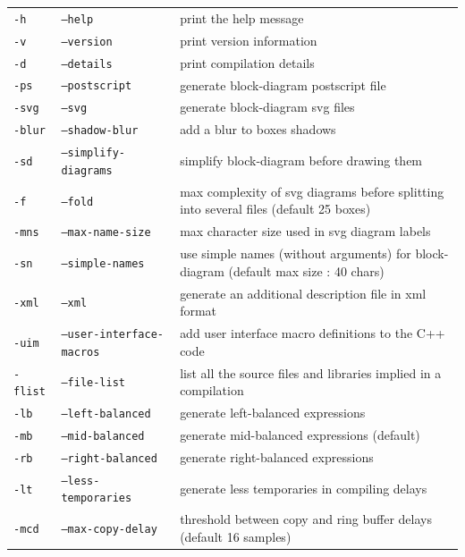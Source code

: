 \documentclass[a4paper,10pt]{book}
\begin{document}
\begin{supertabular}{|p{1.5cm}|p{4cm}|p{5cm}|}  
\texttt{-h} 				& \texttt{--help} 					& print the help message  \\
\texttt{-v} 				& \texttt{--version} 				& print version information  \\
\texttt{-d} 				& \texttt{--details} 				& print compilation details  \\
\texttt{-ps} 				& \texttt{--postscript} 			& generate block-diagram postscript file  \\
\texttt{-svg} 				& \texttt{--svg} 					& generate block-diagram svg files  \\
\texttt{-blur} 				& \texttt{--shadow-blur} 			& add a blur to boxes shadows  \\
\texttt{-sd} 				& \texttt{--simplify-diagrams} 		& simplify block-diagram before drawing them  \\
\texttt{-f } 		& \texttt{--fold }  		& max complexity of svg diagrams before splitting into several files (default 25 boxes)  \\
\texttt{-mns } 		& \texttt{--max-name-size } & max character size used in svg diagram labels\\
\texttt{-sn}             	& \texttt{--simple-names}			& use simple names (without arguments) for block-diagram (default max size : 40 chars) \\
\texttt{-xml} 				& \texttt{--xml} 					& generate an additional description file in xml format  \\
\texttt{-uim} 				& \texttt{--user-interface-macros} 	& add user interface macro definitions to the C++ code  \\
\texttt{-flist} 			& \texttt{--file-list} 				& list all the source files and libraries implied in a compilation  \\
\hline
\texttt{-lb}	 			& \texttt{--left-balanced} 			& generate left-balanced expressions  \\
\texttt{-mb} 				& \texttt{--mid-balanced} 			& generate mid-balanced expressions (default)  \\
\texttt{-rb} 				& \texttt{--right-balanced}			& generate right-balanced expressions  \\
\texttt{-lt} 				& \texttt{--less-temporaries}		& generate less temporaries in compiling delays  \\
\texttt{-mcd }		& \texttt{--max-copy-delay }& threshold between copy and ring buffer delays (default 16 samples)\\

\end{supertabular}
\end{document}
